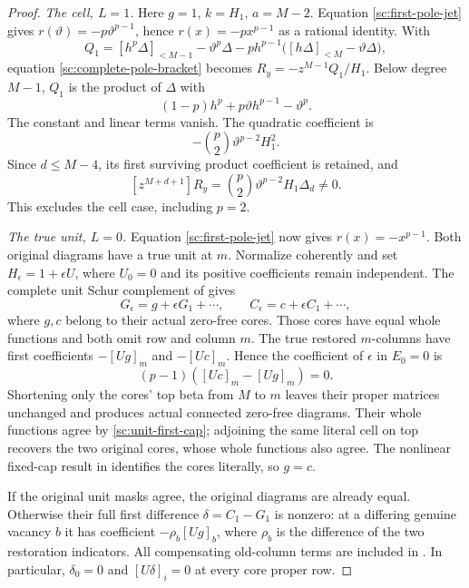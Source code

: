 \documentclass[11pt,a4paper]{amsart}
\numberwithin{equation}{section}
\theoremstyle{plain}
\theoremstyle{definition}
\begin{document}
\begin{proof}
\smallskip\noindent\emph{The cell, \(L=1\).}
Here \(g=1\), \(k=H_1\),
\(a=M-2\).  Equation \eqref{sc:first-pole-jet} gives
\(r(\vartheta)=-p\vartheta^{p-1}\), hence \(r(x)=-px^{p-1}\) as a rational identity.
With
\[
 Q_1=[h^p\Delta]_{<M-1}-\vartheta^p\Delta
       -ph^{p-1}\bigl([h\Delta]_{<M}-\vartheta\Delta\bigr),
\]
equation \eqref{sc:complete-pole-bracket} becomes
\(R_y=-z^{M-1}Q_1/H_1\).  Below degree \(M-1\), \(Q_1\) is the
product of \(\Delta\) with
\[
 (1-p)h^p+p\vartheta h^{p-1}-\vartheta^p.
\]
The constant and linear terms vanish.  The quadratic coefficient is
\[
 -\binom p2\vartheta^{p-2}H_1^2.
\]
Since \(d\le M-4\), its first surviving product coefficient is retained, and
\begin{equation}\label{sc:cell-second-jet}
 [z^{M+d+1}]R_y=\binom p2\vartheta^{p-2}H_1\Delta_d\ne0.
\end{equation}
This excludes the cell case, including \(p=2\).

\smallskip\noindent\emph{The true unit, \(L=0\).}
Equation \eqref{sc:first-pole-jet}
now gives \(r(x)=-x^{p-1}\).  Both original diagrams have a true unit
at \(m\).  Normalize coherently and set \(H_\epsilon=1+\epsilon U\),
where \(U_0=0\) and its positive coefficients remain independent.
The complete unit Schur complement of  gives
\[
 G_\epsilon=g+\epsilon G_1+\cdots,
 \qquad C_\epsilon=c+\epsilon C_1+\cdots,
\]
where \(g,c\) belong to their actual zero-free cores.  Those cores have
equal whole functions and both omit row and column \(m\).  The true
restored \(m\)-columns have first coefficients \(-[Ug]_m\) and
\(-[Uc]_m\).  Hence the coefficient of \(\epsilon\) in \(E_0=0\) is
\begin{equation}\label{sc:unit-first-cap}
 (p-1)([Uc]_m-[Ug]_m)=0.
\end{equation}
Shortening only the cores' top beta from \(M\) to \(m\) leaves their
proper matrices unchanged and produces actual connected zero-free
diagrams.  Their whole functions agree by
\eqref{sc:unit-first-cap}; adjoining the same literal cell on top
recovers the two original cores, whose whole functions also agree.
The nonlinear fixed-cap result in  identifies the
cores literally, so \(g=c\).

If the original unit masks agree, the original diagrams are already
equal.  Otherwise their full first difference
\(\delta=C_1-G_1\) is nonzero: at a differing genuine vacancy \(b\) it
has coefficient \(-\rho_b[Ug]_b\), where \(\rho_b\) is the difference
of the two restoration indicators.  All compensating old-column
terms are included in .  In particular,
\(\delta_0=0\) and \([U\delta]_i=0\) at every core proper row.


\end{proof}
\end{document}
